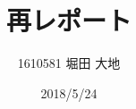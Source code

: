 \documentclass[twocolumn, 10pt,a4j]{jsarticle}
\title{\vspace{-2.5cm}再レポート}
\author{1610581 堀田 大地}
\date{2018/5/24}
\begin{document}
\maketitle{}
\end{document}
